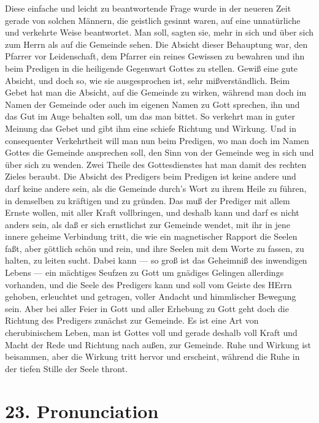 Diese einfache und leicht zu beantwortende Frage wurde in der neueren Zeit gerade von solchen Männern, die geistlich gesinnt waren, auf eine unnatürliche und verkehrte Weise beantwortet. Man soll, sagten sie, mehr in sich und über sich zum Herrn als auf die Gemeinde sehen. Die Absicht dieser Behauptung war, den Pfarrer vor Leidenschaft, dem Pfarrer ein reines Gewissen zu bewahren und ihn beim Predigen in die heiligende Gegenwart Gottes zu stellen. Gewiß eine gute Absicht, und doch so, wie sie ausgesprochen ist, sehr mißverständlich. Beim Gebet hat man die Absicht, auf die Gemeinde zu wirken, während man doch im Namen der Gemeinde oder auch im eigenen Namen zu Gott sprechen, ihn und das Gut im Auge behalten soll, um das man bittet. So verkehrt man in guter Meinung das Gebet und gibt ihm eine schiefe Richtung und Wirkung. Und in consequenter Verkehrtheit will man nun beim Predigen, wo man doch im Namen Gottes die Gemeinde ansprechen soll, den Sinn von der Gemeinde weg in sich und über sich zu wenden. Zwei Theile des Gottesdienstes hat man damit des rechten Zieles beraubt. Die Absicht des Predigers beim Predigen ist keine andere und darf keine andere sein, als die Gemeinde durch’s Wort zu ihrem Heile zu führen, in demselben zu kräftigen und zu gründen. Das muß der Prediger mit allem Ernste wollen, mit aller Kraft vollbringen, und deshalb kann und darf es nicht anders sein, als daß er sich ernstlichst zur Gemeinde wendet, mit
ihr in jene innere geheime Verbindung tritt, die wie ein magnetischer Rapport die Seelen faßt, aber göttlich schön und rein, und ihre Seelen mit dem Worte zu fassen, zu halten, zu leiten sucht. Dabei kann — so groß ist das Geheimniß des inwendigen Lebens — ein mächtiges Seufzen zu Gott um gnädiges Gelingen allerdings vorhanden, und die Seele des Predigers kann und soll vom Geiste des HErrn gehoben, erleuchtet und getragen, voller Andacht und himmlischer Bewegung sein. Aber bei aller Feier in Gott und aller Erhebung zu Gott geht doch die Richtung des Predigers zunächst zur Gemeinde. Es ist eine Art von cherubinischem Leben, man ist Gottes voll und gerade deshalb voll Kraft und Macht der Rede und Richtung nach außen, zur Gemeinde. Ruhe und Wirkung ist beisammen, aber die Wirkung tritt hervor und erscheint, während die Ruhe in der tiefen Stille der Seele thront.

\section{23. Pronunciation}

